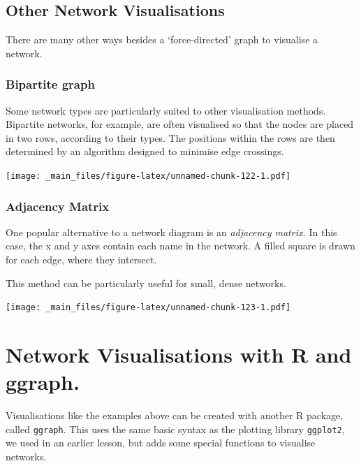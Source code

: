 \documentclass[
]{book}
\begin{document}
\hypertarget{other-network-visualisations}{%
\subsection{Other Network Visualisations}\label{other-network-visualisations}}

There are many other ways besides a `force-directed' graph to visualise a network.

\hypertarget{bipartite-graph}{%
\subsubsection{Bipartite graph}\label{bipartite-graph}}

Some network types are particularly suited to other visualisation methods. Bipartite networks, for example, are often visualised so that the nodes are placed in two rows, according to their types. The positions within the rows are then determined by an algorithm designed to minimise edge crossings.

\texttt{[image: \_main\_files/figure-latex/unnamed-chunk-122-1.pdf]}

\hypertarget{adjacency-matrix}{%
\subsubsection{Adjacency Matrix}\label{adjacency-matrix}}

One popular alternative to a network diagram is an \emph{adjacency matrix.} In this case, the x and y axes contain each name in the network. A filled square is drawn for each edge, where they intersect.

This method can be particularly useful for small, dense networks.

\texttt{[image: \_main\_files/figure-latex/unnamed-chunk-123-1.pdf]}

\hypertarget{network-visualisations-with-r-and-ggraph.}{%
\section{Network Visualisations with R and ggraph.}\label{network-visualisations-with-r-and-ggraph.}}

Visualisations like the examples above can be created with another R package, called \texttt{ggraph}. This uses the same basic syntax as the plotting library \texttt{ggplot2}, we used in an earlier lesson, but adds some special functions to visualise networks.
\end{document}
